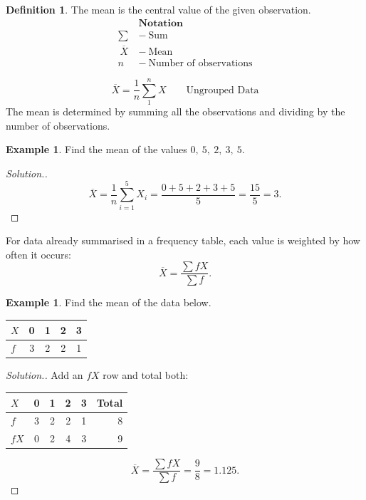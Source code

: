 \documentclass[11pt,a4paper]{article}
\theoremstyle{definition}
\newtheorem{definition}[thm]{Definition}
\newtheorem{example}[thm]{Example}
\newenvironment{solution}
  {\renewcommand{\qedsymbol}{}\begin{proof}[\textit{Solution}.]}
  {\end{proof}}
\begin{document}
\begin{definition}
The mean is the central value of the given observation.
\begin{align*}
&\textbf{Notation}\\
\sum \ &-\ \text{Sum}\\\
\overline{X}\ &-\ \text{Mean}\\
n\ &-\ \text{Number of observations}
\end{align*}
\end{definition}



\[\overline{X}=\frac{1}{n}\sum_1^nX\qquad \text{Ungrouped Data}\]
The mean is determined by summing all the observations and dividing by the number of observations.\\




\begin{example}
Find the mean of the values $0,\ 5,\ 2,\ 3,\ 5$.
\end{example}

\begin{solution}
\[\overline{X}=\frac{1}{n}\sum_{i=1}^{5}X_i=\frac{0+5+2+3+5}{5}=\frac{15}{5}=3.\]
\end{solution}

For data already summarised in a frequency table, each value is weighted by how often it
occurs:
\[\overline{X}=\frac{\sum fX}{\sum f}.\]

\begin{example}
Find the mean of the data below.
\begin{table}[H]
\centering
\begin{tabular}{lcccc}
$X$ & 0 & 1 & 2 & 3\\
\hline
$f$ & 3 & 2 & 2 & 1\\
\end{tabular}
\end{table}
\end{example}

\begin{solution}
Add an $fX$ row and total both:
\begin{table}[H]
\centering
\begin{tabular}{lccccr}
$X$  & 0 & 1 & 2 & 3 & Total\\
\hline
$f$  & 3 & 2 & 2 & 1 & 8\\
$fX$ & 0 & 2 & 4 & 3 & 9\\
\end{tabular}
\end{table}
\[\overline{X}=\frac{\sum fX}{\sum f}=\frac{9}{8}=1.125.\]
\end{solution}
\end{document}
